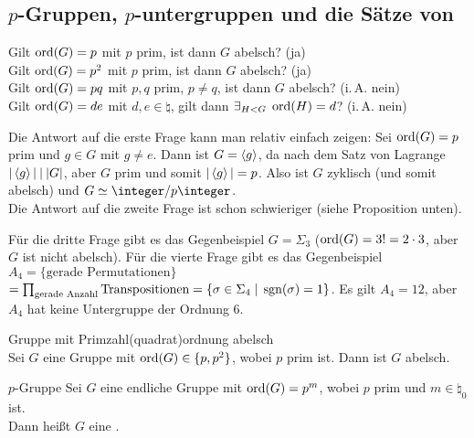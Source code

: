 \subsection{%
    \texorpdfstring{$p$}{p}-Gruppen, \texorpdfstring{$p$}{p}-untergruppen und
    die Sätze von %
}

\begin{Bem}
    Gilt $\operatorname{ord}(G) = p$ mit $p$ prim, ist dann $G$ abelsch? (ja)\\
    Gilt $\operatorname{ord}(G) = p^2$ mit $p$ prim, ist dann $G$ abelsch? (ja)\\
    Gilt $\operatorname{ord}(G) = pq$ mit $p, q$ prim, $p \not= q$, ist dann
    $G$ abelsch? (i.\,A. nein)\\
    Gilt $\operatorname{ord}(G) = de$ mit $d, e \in \natural$, gilt dann
    $\exists_{H < G}\; \operatorname{ord}(H) = d$? (i.\,A. nein)
\end{Bem}

\begin{Bem}
    Die Antwort auf die erste Frage kann man relativ einfach zeigen:
    Sei $\operatorname{ord}(G) = p$ prim und $g \in G$ mit $g \not= e$.
    Dann ist $G = \left\langle g\right\rangle$, da nach dem Satz von Lagrange
    $|\left\langle g\right\rangle| \mathbin{|} |G|$, aber $G$ prim und somit $|\left\langle g\right\rangle| = p$.
    Also ist $G$ zyklisch (und somit abelsch) und
    $G \simeq \integer/p\integer$.\\
    Die Antwort auf die zweite Frage ist schon schwieriger
    (siehe Proposition unten).
\end{Bem}

\begin{Bsp}
    Für die dritte Frage gibt es das Gegenbeispiel
    $G = \Sigma_3$ ($\operatorname{ord}(G) = 3! = 2 \cdot 3$, aber $G$ ist nicht abelsch).
    Für die vierte Frage gibt es das Gegenbeispiel
    $A_4 = \{\text{gerade Permutationen}\}$\\
    $= \prod_{\text{gerade Anzahl}} \text{Transpositionen}
    = \{\sigma \in \Sigma_4 \;|\; \operatorname{sgn}(\sigma) = 1\}$.
    Es gilt $A_4 = 12$, aber $A_4$ hat keine Untergruppe der Ordnung $6$.
\end{Bsp}

\begin{Prop}{Gruppe mit Primzahl(quadrat)ordnung abelsch}\\
    Sei $G$ eine Gruppe mit $\operatorname{ord}(G) \in \{p, p^2\}$, wobei $p$ prim ist.
    Dann ist $G$ abelsch.
\end{Prop}

\linie

\begin{Def}{$p$-Gruppe}
    Sei $G$ eine endliche Gruppe mit $\operatorname{ord}(G) = p^m$, wobei $p$ prim und
    $m \in \natural_0$ ist.\\
    Dann heißt $G$ eine .
\end{Def}

